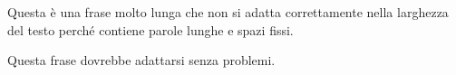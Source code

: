 \documentclass{article}
\begin{document}
\overfullrule=10pt

Questa è una frase molto lunga che non si adatta correttamente nella larghezza del testo perché contiene parole lunghe e spazi fissi.

Questa frase dovrebbe adattarsi senza problemi.
\end{document}
